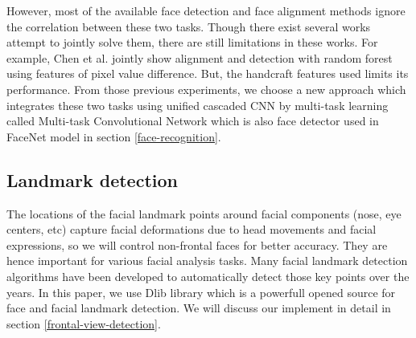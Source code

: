 \documentclass[journal, twocolumn]{IEEEtran}
\begin{document}
However, most of the available face detection and face alignment methods ignore the correlation between these two tasks. Though there exist several works attempt to jointly solve them, there are still limitations in these works. For example, Chen et al. \cite{ref:detect-14} jointly show alignment and detection with random forest using features of pixel value difference. But, the handcraft features used limits its performance. From those previous experiments, we choose a new approach which integrates these two tasks using unified cascaded CNN by multi-task learning called Multi-task Convolutional Network which is also face detector used in FaceNet model in section \ref{face-recognition}.


\subsection{Landmark detection}
The locations of the facial landmark points around facial components (nose, eye centers, etc) capture facial deformations due to head movements and facial expressions, so we will control non-frontal faces for better accuracy. They are hence important for various facial analysis tasks. Many facial landmark detection algorithms have been developed to automatically detect those key points over the years. In this paper, we use Dlib library which is a powerfull opened source for face and facial landmark detection. We will discuss our implement in detail in section \ref{frontal-view-detection}.


\end{document}
